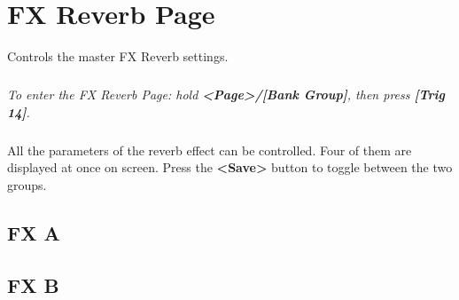 \chapter{FX Reverb Page}
Controls the master FX Reverb settings.\\
\vspace{-16pt}
\vspace{-32pt}
\paragraph{}\textit{To enter the FX Reverb Page: hold \textbf{<Page>/[Bank Group]}, then press \textbf{[Trig 14]}.}
\vspace{-16pt}
\paragraph{}
All the parameters of the reverb effect can be controlled. Four of them are displayed at once on screen. Press the \textbf{<Save>} button to toggle between the two groups.

\vspace{-4pt}
\section{FX A}
\vspace{-16pt}
\vspace{-25pt}
\vspace{-10pt}
\section{FX B}
\vspace{-16pt}
\vspace{-25pt}
\begin{figure}[h!]
\end{figure}
